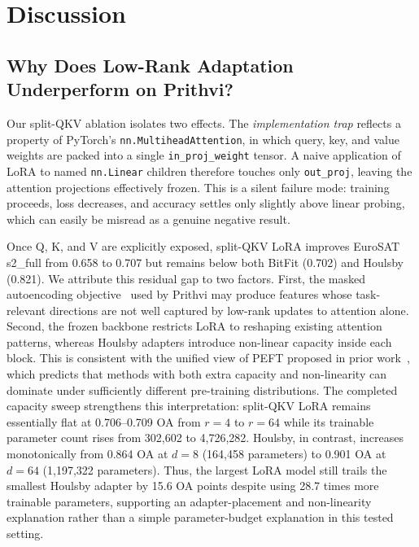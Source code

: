 \documentclass[11pt]{article}
\begin{document}
\section{Discussion}
\label{sec:discussion}

\subsection{Why Does Low-Rank Adaptation Underperform on Prithvi?}
Our split-QKV ablation isolates two effects. The \emph{implementation trap} reflects a property of PyTorch's \texttt{nn.MultiheadAttention}, in which query, key, and value weights are packed into a single \texttt{in\_proj\_weight} tensor. A naive application of LoRA to named \texttt{nn.Linear} children therefore touches only \texttt{out\_proj}, leaving the attention projections effectively frozen. This is a silent failure mode: training proceeds, loss decreases, and accuracy settles only slightly above linear probing, which can easily be misread as a genuine negative result.

Once Q, K, and V are explicitly exposed, split-QKV LoRA improves EuroSAT s2\_full from 0.658 to 0.707 but remains below both BitFit (0.702) and Houlsby (0.821). We attribute this residual gap to two factors. First, the masked autoencoding objective~\cite{he2022mae} used by Prithvi may produce features whose task-relevant directions are not well captured by low-rank updates to attention alone. Second, the frozen backbone restricts LoRA to reshaping existing attention patterns, whereas Houlsby adapters introduce non-linear capacity inside each block. This is consistent with the unified view of PEFT proposed in prior work~\cite{he2022unified}, which predicts that methods with both extra capacity and non-linearity can dominate under sufficiently different pre-training distributions. The completed capacity sweep strengthens this interpretation: split-QKV LoRA remains essentially flat at 0.706--0.709 OA from $r=4$ to $r=64$ while its trainable parameter count rises from 302{,}602 to 4{,}726{,}282. Houlsby, in contrast, increases monotonically from 0.864 OA at $d=8$ (164{,}458 parameters) to 0.901 OA at $d=64$ (1{,}197{,}322 parameters). Thus, the largest LoRA model still trails the smallest Houlsby adapter by 15.6 OA points despite using 28.7 times more trainable parameters, supporting an adapter-placement and non-linearity explanation rather than a simple parameter-budget explanation in this tested setting.
\end{document}

